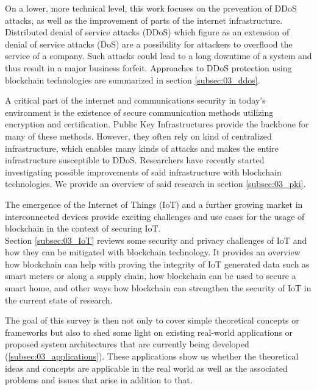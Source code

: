On a lower, more technical level, this work focuses on the prevention of DDoS attacks, as well as the improvement of parts of the internet infrastructure. Distributed denial of service attacks (DDoS) which figure as an extension of denial of service attacks (DoS) are a possibility for attackers to overflood the service of a company. Such attacks could lead to a long downtime of a system and thus result in a major business forfeit. Approaches to DDoS protection using blockchain technologies are summarized in section \ref{subsec:03_ddos}.

A critical part of the internet and communications security in today's environment is the existence of secure communication methods utilizing encryption and certification. Public Key Infrastructures provide the backbone for many of these methods. However, they often rely on kind of centralized infrastructure, which enables many kinds of attacks and makes the entire infrastructure susceptible to DDoS. Researchers have recently started investigating possible improvements of said infrastructure with blockchain technologies. We provide an overview of said research in section \ref{subsec:03_pki}.

The emergence of the Internet of Things (IoT) and a further growing market in interconnected devices provide exciting challenges and use cases for the usage of blockchain in the context of securing IoT.\\
Section \ref{subsec:03_IoT} reviews some security and privacy challenges of IoT and how they can be mitigated with blockchain technology. It provides an overview how blockchain can help with proving the integrity of IoT generated data such as smart meters or along a supply chain, how blockchain can be used to secure a smart home, and other ways how blockchain can strengthen the security of IoT in the current state of research.

The goal of this survey is then not only to cover simple theoretical concepts or frameworks but also to shed some light on existing real-world applications or proposed system architectures that are currently being developed (\ref{subsec:03_applications}). These applications show us whether the theoretical ideas and concepts are applicable in the real world as well as the associated problems and issues that arise in addition to that.
